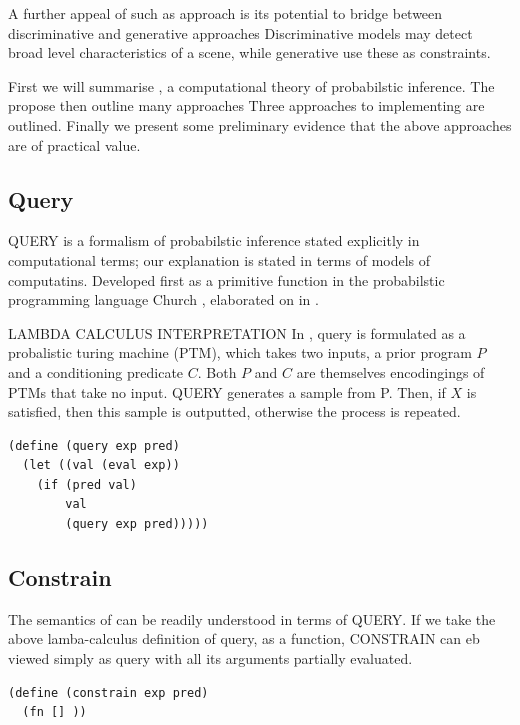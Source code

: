 A further appeal of such as approach is its potential to bridge between discriminative and generative approaches
Discriminative models may detect broad level characteristics of a scene, while generative use these as constraints.

First we will summarise , a computational theory of probabilstic inference.
The propose then outline many approaches
Three approaches to implementing  are outlined.
Finally we present some preliminary evidence that the above approaches are of practical value.


\subsection{Query}

QUERY is a formalism of probabilstic inference stated explicitly in computational terms; our explanation is stated in terms of models of computatins.
Developed first as a primitive function in the probabilstic programming language Church \citep{CHURCH}, elaborated on in \citep{VIKASH}.

LAMBDA CALCULUS INTERPRETATION
In \citep{FREER:2012}, query is formulated as a probalistic turing machine (PTM), which takes two inputs, a prior program $P$ and a conditioning predicate $C$.
Both $P$ and $C$ are themselves encodingings of PTMs that take no input.
QUERY generates a sample from P.
Then, if $X$ is satisfied, then this sample is outputted, otherwise the process is repeated.

\begin{verbatim}
(define (query exp pred)
  (let ((val (eval exp))
    (if (pred val)
        val
        (query exp pred)))))
\end{verbatim}

\subsection{Constrain}
The semantics of  can be readily understood in terms of QUERY.
If we take the above lamba-calculus definition of query, as a function, CONSTRAIN can eb viewed simply as query with all its arguments partially evaluated.

\begin{verbatim}
(define (constrain exp pred)
  (fn [] ))
\end{verbatim}

